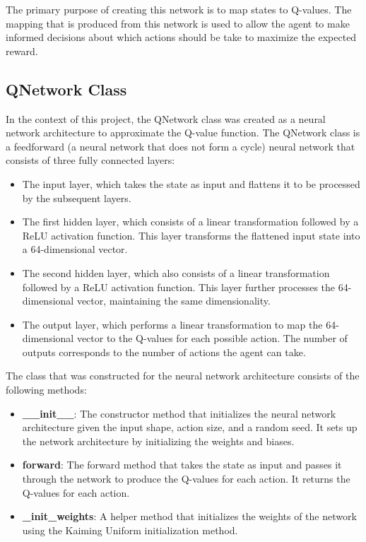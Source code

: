 \documentclass[
	a4paper, %
	10pt, %
	unnumberedsections, %
	twoside, %
]{LTJournalArticle}
\begin{document}
The primary purpose of creating this network is to map states to Q-values. The mapping that is produced from this network is used to allow the agent to make informed decisions about which actions should be
take to maximize the expected reward.

\subsection{QNetwork Class}

In the context of this project, the QNetwork class was created as a neural network architecture to approximate the Q-value function. The QNetwork class is a feedforward (a neural network that does 
not form a cycle) neural network that consists of three fully connected layers:

\begin{itemize}
	\item The input layer, which takes the state as input and flattens it to be processed by the subsequent layers.
	\item The first hidden layer, which consists of a linear transformation followed by a ReLU activation function. This layer transforms the flattened input state into a 64-dimensional vector.
	\item The second hidden layer, which also consists of a linear transformation followed by a ReLU activation function. This layer further processes the 64-dimensional vector, maintaining the same dimensionality.
	\item The output layer, which performs a linear transformation to map the 64-dimensional vector to the Q-values for each possible action. The number of outputs corresponds to the number of actions the agent can take.
\end{itemize}

The class that was constructed for the neural network architecture consists of the following methods:

\begin{itemize}
	\item \textbf{\_\_init\_\_}: The constructor method that initializes the neural network architecture given the input shape, action size, and a random seed. It sets up the network architecture by initializing 
	the weights and biases.
	\item \textbf{forward}: The forward method that takes the state as input and passes it through the network to produce the Q-values for each action. It returns the Q-values for each action.
	\item \textbf{\_init\_weights}: A helper method that initializes the weights of the network using the Kaiming Uniform initialization method.
\end{itemize}
\end{document}
